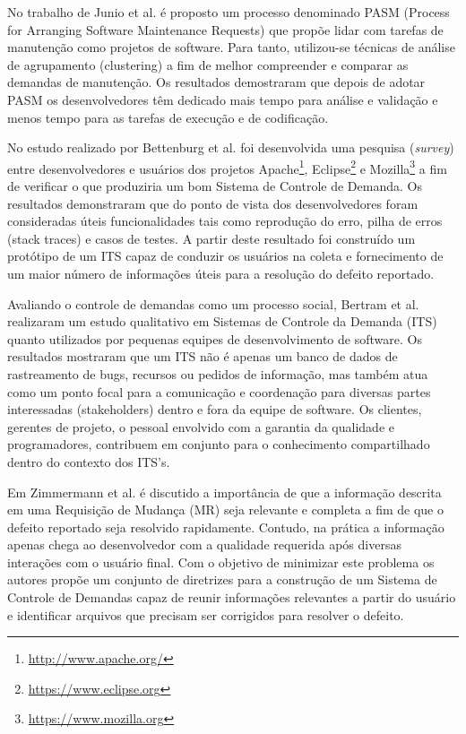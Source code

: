 \documentclass[msc,proposal,hidelot,hideabstract]{ppgccufmg} %
\begin{document}
No trabalho de Junio et al. \cite{5741246} é proposto um processo denominado PASM (Process for Arranging
Software Maintenance Requests) que propõe lidar com tarefas de manutenção como
projetos de software. Para tanto, utilizou-se técnicas de análise de
agrupamento (clustering) a fim de melhor compreender e comparar as demandas de
manutenção. Os resultados demostraram que depois de adotar PASM os
desenvolvedores têm dedicado mais tempo para análise e validação e menos tempo
para as tarefas de execução e de codificação.

No estudo realizado por Bettenburg et al. \cite{bettenburg2008makes} foi
desenvolvida uma pesquisa (\textit{survey}) entre desenvolvedores e usuários dos
projetos Apache\footnote{\url{http://www.apache.org/}},
Eclipse\footnote{\url{https://www.eclipse.org}} e
Mozilla\footnote{\url{https://www.mozilla.org}} a fim de verificar o que
produziria um bom Sistema de Controle de Demanda. Os resultados demonstraram
que do ponto de vista dos desenvolvedores foram consideradas úteis
funcionalidades tais como reprodução do erro, pilha de erros (stack traces) e casos de
testes. A partir deste resultado foi construído um protótipo de um ITS
capaz de conduzir os usuários na coleta e fornecimento de um maior número de
informações úteis para a resolução do defeito reportado.

Avaliando o controle de demandas como um processo social, Bertram et
al. \cite{Bertram:2010:CCB:1718918.1718972} realizaram um estudo qualitativo em
Sistemas de Controle da Demanda (ITS) quanto utilizados por pequenas equipes de
desenvolvimento de software. Os resultados mostraram que um ITS não é apenas um
banco de dados de rastreamento de bugs, recursos ou pedidos de informação, mas
também atua como um ponto focal para a comunicação e coordenação para diversas
partes interessadas (stakeholders) dentro e fora da equipe de software. Os
clientes, gerentes de projeto, o pessoal envolvido com a garantia da qualidade
e programadores, contribuem em conjunto para o conhecimento compartilhado dentro do contexto dos ITS's.

Em Zimmermann et al. \cite{5070993} é discutido a importância de que a
informação descrita em uma Requisição de Mudança (MR) seja relevante e completa
a fim de que o defeito reportado seja resolvido rapidamente. Contudo, na prática
a informação apenas chega ao desenvolvedor com a qualidade requerida após
diversas interações com o usuário final. Com o objetivo de minimizar este
problema os autores propõe um conjunto de diretrizes para a construção de um
Sistema de Controle de Demandas capaz de reunir informações relevantes a partir do usuário e identificar arquivos que precisam
ser corrigidos para resolver o defeito.
\end{document}
